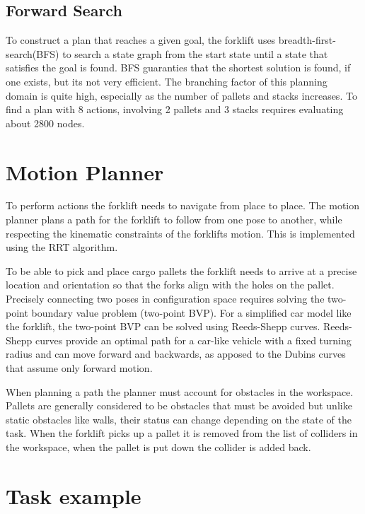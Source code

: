 \documentclass[letterpaper, 10 pt, conference]{ieeeconf}  %
\begin{document}
\subsection{Forward Search}

To construct a plan that reaches a given goal, the forklift uses breadth-first-search(BFS) to search a state graph from the start state until a state that satisfies the goal is found. BFS guaranties that the shortest solution is found, if one exists, but its not very efficient. The branching factor of this planning domain is quite high, especially as the number of pallets and stacks increases. To find a plan with 8 actions, involving 2 pallets and 3 stacks requires evaluating about 2800 nodes. 

\label{motion_planner}
\section{Motion Planner}

To perform actions the forklift needs to navigate from place to place. The motion planner plans a path for the forklift to follow from one pose to another, while respecting the kinematic constraints of the forklifts motion. This is implemented using the RRT algorithm.  

To be able to pick and place cargo pallets the forklift needs to arrive at a precise location and orientation so that the forks align with the holes on the pallet. Precisely connecting two poses in configuration space requires solving the two-point boundary value problem (two-point BVP). For a simplified car model like the forklift, the two-point BVP can be solved using Reeds-Shepp curves. Reeds-Shepp curves provide an optimal path for a car-like vehicle with a fixed turning radius and can move forward and backwards, as apposed to the Dubins curves that assume only forward motion. 

When planning a path the planner must account for obstacles in the workspace. Pallets are generally considered to be obstacles that must be avoided but unlike static obstacles like walls, their status can change depending on the state of the task. When the forklift picks up a pallet it is removed from the list of colliders in the workspace, when the pallet is put down the collider is added back.

\label{tamp}
\section{Task example}
\end{document}
